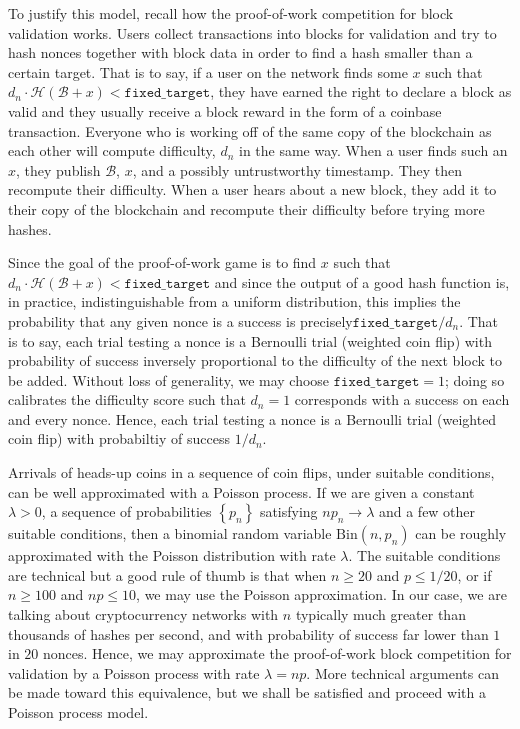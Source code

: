 \documentclass[12pt,english]{mrl}
\theoremstyle{definition}
\renewcommand{\geq}{\geqslant}
\renewcommand{\leq}{\leqslant}
\numberwithin{equation}{section}
\numberwithin{figure}{section}
\numberwithin{equation}{section}
\numberwithin{equation}{section}
\numberwithin{figure}{section}
\begin{document}
To justify this model, recall how the proof-of-work competition for block validation works. Users collect transactions into blocks for validation and try to hash nonces together with block data in order to find a hash smaller than a certain target. That is to say, if a user on the network finds some $x$ such that $d_{n}\cdot \mathcal{H}(\mathcal{B} + x) < \texttt{fixed\_target}$, they have earned the right to declare a block as valid and they usually receive a block reward in the form of a coinbase transaction. Everyone who is working off of the same copy of the blockchain as each other will compute difficulty, $d_{n}$ in the same way. When a user finds such an $x$, they publish $\mathcal{B}$, $x$, and a possibly untrustworthy timestamp. They then recompute their difficulty. When a user hears about a new block, they add it to their copy of the blockchain and recompute their difficulty before trying more hashes.

Since the goal of the proof-of-work game is to find $x$ such that $d_{n} \cdot \mathcal{H}(\mathcal{B} + x) < \texttt{fixed\_target}$ and since the output of a good hash function is, in practice, indistinguishable from a uniform distribution, this implies the probability that any given nonce is a success is precisely$\texttt{fixed\_target}/d_{n}$. That is to say, each trial testing a nonce is a Bernoulli trial (weighted coin flip) with probability of success inversely proportional to the difficulty of the next block to be added. Without loss of generality, we may choose  $\texttt{fixed\_target}=1$; doing so calibrates the difficulty score such that $d_n=1$ corresponds with a success on each and every nonce. Hence, each trial testing a nonce is a Bernoulli trial (weighted coin flip) with probabiltiy of success $1/d_n$.

Arrivals of heads-up coins in a sequence of coin flips, under suitable conditions, can be well approximated with a Poisson process. If we are given a constant $\lambda > 0$, a sequence of probabilities $\left\{p_n\right\}$ satisfying $n p_n \longrightarrow \lambda$ and a few other suitable conditions, then a binomial random variable $\text{Bin}(n,p_n)$ can be roughly approximated with the Poisson distribution with rate $\lambda$. The suitable conditions are technical but a good rule of thumb is that when $n \geq 20$ and $p \leq 1/20$, or if $n \geq 100$ and $np \leq 10$, we may use the Poisson approximation. In our case, we are talking about cryptocurrency networks with $n$ typically much greater than thousands of hashes per second, and with probability of success far lower than $1$ in $20$ nonces. Hence, we may approximate the proof-of-work block competition for validation by a Poisson process with rate $\lambda = np$. More technical arguments can be made toward this equivalence, but we shall be satisfied and proceed with a Poisson process model.
\end{document}
